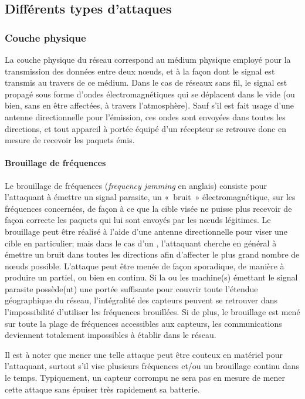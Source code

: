 \subsection{Différents types d'attaques}

    \subsubsection{Couche physique}
La couche physique du réseau correspond au médium physique employé pour la transmission des données entre deux nœuds, et à la façon dont le signal est transmis au travers de ce médium.
Dans le cas de réseaux sans fil, le signal est propagé sous forme d'ondes électromagnétiques qui se déplacent dans le vide (ou bien, sans en être affectées, à travers l'atmosphère).
Sauf s'il est fait usage d'une antenne directionnelle pour l'émission, ces ondes sont envoyées dans toutes les directions, et tout appareil à portée équipé d'un récepteur se retrouve donc en mesure de recevoir les paquets émis.

        \paragraph{Brouillage de fréquences}
Le brouillage de fréquences (\textit{frequency jamming} en anglais) consiste pour l'attaquant à émettre un signal parasite, un « bruit » électromagnétique, sur les fréquences concernées, de façon à ce que la cible visée ne puisse plus recevoir de façon correcte les paquets qui lui sont envoyés par les nœuds légitimes.
Le brouillage peut être réalisé à l'aide d'une antenne directionnelle pour viser une cible en particulier; mais dans le cas d'un \rc, l'attaquant cherche en général à émettre un bruit dans toutes les directions afin d'affecter le plus grand nombre de nœuds possible.
L'attaque peut être menée de façon sporadique, de manière à produire un \dds partiel, ou bien en continu.
Si la ou les machine(s) émettant le signal parasite possède(nt) une portée suffisante pour couvrir toute l'étendue géographique du réseau, l'intégralité des capteurs peuvent se retrouver dans l'impossibilité d'utiliser les fréquences brouillées.
Si de plus, le brouillage est mené sur toute la plage de fréquences accessibles aux capteurs, les communications deviennent totalement impossibles à établir dans le réseau.

Il est à noter que mener une telle attaque peut être couteux en matériel pour l'attaquant, surtout s'il vise plusieurs fréquences et/ou un brouillage continu dans le temps.
Typiquement, un capteur corrompu ne sera pas en mesure de mener cette attaque sans épuiser très rapidement sa batterie.

